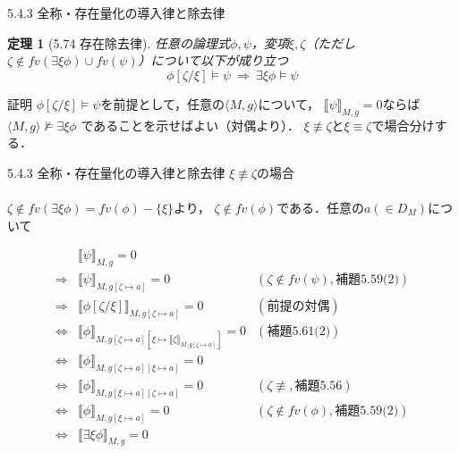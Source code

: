 \documentclass[dvipdfmx,11pt]{beamer}
\newtheorem{theo}[theorem]{定理}
\begin{document}
\begin{frame}{5.4.3 全称・存在量化の導入律と除去律}
  \begin{theo}[5.74 存在除去律]
    任意の論理式\(\phi,\psi\)，変項\(\xi,\zeta\)（ただし\(\zeta \notin \textit{fv}(\exists \xi \phi) \cup \textit{fv}(\psi)\)）について以下が成り立つ
    \[
    \phi [ \zeta / \xi ] \vDash \psi \ \Longrightarrow \ \exists \xi \phi \vDash \psi
    \]
  \end{theo}

  \begin{block}{証明}
    \(\phi[\zeta/\xi]\vDash\psi\)を前提として，任意の\(\langle M,g \rangle\)について，
    \(\llbracket\psi\rrbracket_{M,g}=0\)ならば\(\langle M,g \rangle\nvDash\exists\xi\phi\)
    であることを示せばよい（対偶より）．
    \(\xi\not\equiv\zeta\)と\(\xi\equiv\zeta\)で場合分けする．
  \end{block}
\end{frame}

\begin{frame}{5.4.3 全称・存在量化の導入律と除去律}
  \(\xi\not\equiv\zeta\)の場合\\\mbox{}\\

  \(\zeta\not\in\textit{fv}(\exists\xi\phi)=\textit{fv}(\phi)-\{\xi\}\)より，
  \(\zeta\not\in\textit{fv}(\phi)\)である．任意の\(a(\in D_M)\)について

  \[
  \begin{array}{rll}
    & \llbracket\psi\rrbracket_{M,g}=0 & \\
    \Longrightarrow & \llbracket\psi\rrbracket_{M,g[\zeta\mapsto a]}=0 & (\zeta\not\in\textit{fv}(\psi),\textit{補題5.59(2)}) \\
    \Longrightarrow & \llbracket\phi[\zeta/\xi]\rrbracket_{M,g[\zeta\mapsto a]}=0 & (\textit{前提の対偶}) \\
    \iff & \llbracket\phi\rrbracket_{M,g[\zeta\mapsto a][\xi\mapsto\llbracket\zeta\rrbracket_{M,g[\zeta\mapsto a]}]}=0 & (\textit{補題5.61(2)}) \\
    \iff & \llbracket\phi\rrbracket_{M,g[\zeta\mapsto a][\xi\mapsto a]}=0 & \\
    \iff & \llbracket\phi\rrbracket_{M,g[\xi\mapsto a][\zeta\mapsto a]}=0 & (\zeta\not\equiv,\textit{補題5.56}) \\
    \iff & \llbracket\phi\rrbracket_{M,g[\xi\mapsto a]}=0 & (\zeta\not\in\textit{fv}(\phi),\textit{補題5.59(2)}) \\
    \iff & \llbracket\exists\xi\phi\rrbracket_{M,g}=0 & 
  \end{array}
  \]
\end{frame}
\end{document}
